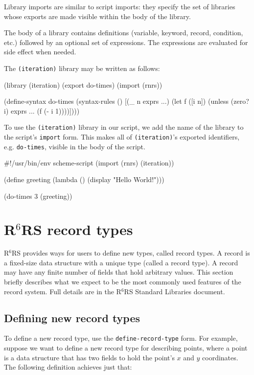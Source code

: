 \documentclass[onecolumn, 12pt, twoside, openright, dvipdfm]{book}
\newcommand{\rnrs}[1]{R$^{\mathrm{#1}}$RS}
\begin{document}
Library imports are similar to script imports: they specify the set
of libraries whose exports are made visible within the body of the
library.  

The body of a library contains definitions (variable, keyword,
record, condition, etc.) followed by an optional set of expressions.
The expressions are evaluated for side effect when needed.


The \texttt{(iteration)} library may be written as follows:

\begin{CodeInline}
(library (iteration)
  (export do-times)
  (import (rnrs))

  (define-syntax do-times
    (syntax-rules ()
      [(_ n exprs ...)
       (let f ([i n])
         (unless (zero? i)
           exprs ...
           (f (- i 1))))])))
\end{CodeInline}

To use the \texttt{(iteration)} library in our script, we add the
name of the library to the script's \texttt{import} form.  This
makes all of \texttt{(iteration)}'s exported identifiers, e.g.
\texttt{do-times},  visible in the body of the script.

\begin{CodeInline}
#!/usr/bin/env scheme-script
(import (rnrs) (iteration))

(define greeting
  (lambda ()
    (display "Hello World!\n")))

(do-times 3 (greeting))
\end{CodeInline}

\section{\rnrs{6} record types}

\rnrs{6} provides ways for users to define new types, called record
types.  A record is a fixed-size data structure with a unique type
(called a record type).  A record may have any finite number of
fields that hold arbitrary values.  This section briefly describes
what we expect to be the most commonly used features of the record
system.  Full details are in the \rnrs{6} Standard Libraries
document\cite{r6rs:lib}.

\subsection{Defining new record types}

To define a new record type,  use the \texttt{define-record-type}
form.  For example, suppose we want to define a new record type for
describing points, where a point is a data structure that has two
fields to hold the point's $x$ and $y$ coordinates.  The following
definition achieves just that:
\end{document}
